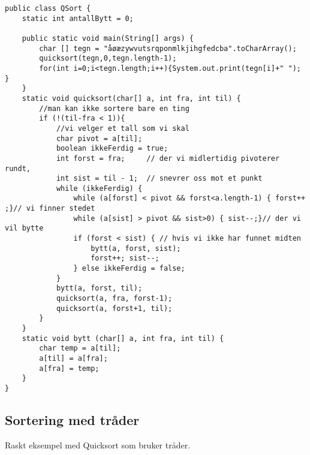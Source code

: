 \documentclass[11pt]{article}
\begin{document}
\begin{verbatim}
public class QSort {
    static int antallBytt = 0;

    public static void main(String[] args) {
        char [] tegn = "åøæzywvutsrqponmlkjihgfedcba".toCharArray();
        quicksort(tegn,0,tegn.length-1);
        for(int i=0;i<tegn.length;i++){System.out.print(tegn[i]+" "); }
    }
    static void quicksort(char[] a, int fra, int til) {
        //man kan ikke sortere bare en ting
        if (!(til-fra < 1)){
            //vi velger et tall som vi skal
            char pivot = a[til];
            boolean ikkeFerdig = true;
            int forst = fra;     // der vi midlertidig pivoterer rundt, 
            int sist = til - 1;  // snevrer oss mot et punkt
            while (ikkeFerdig) {
                while (a[forst] < pivot && forst<a.length-1) { forst++ ;}// vi finner stedet
                while (a[sist] > pivot && sist>0) { sist--;}// der vi vil bytte
                if (forst < sist) { // hvis vi ikke har funnet midten
                    bytt(a, forst, sist);
                    forst++; sist--;
                } else ikkeFerdig = false; 
            }
            bytt(a, forst, til);
            quicksort(a, fra, forst-1);
            quicksort(a, forst+1, til);
        }
    }
    static void bytt (char[] a, int fra, int til) {
        char temp = a[til];
        a[til] = a[fra];
        a[fra] = temp;
    }
}
\end{verbatim}
\subsection{Sortering med tråder}
\label{sec-12_3}

Raskt eksempel med Quicksort som bruker tråder.
\end{document}
